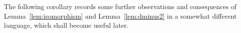 \documentclass[centering,11pt,reqno]{amsart}
\theoremstyle{definition}
\begin{document}


The following corollary records some further observations and consequences of Lemma~\ref{lem:isomorphism} and Lemma~\ref{lem:dminus2} in a somewhat different language, which shall become useful later.
\end{document}
